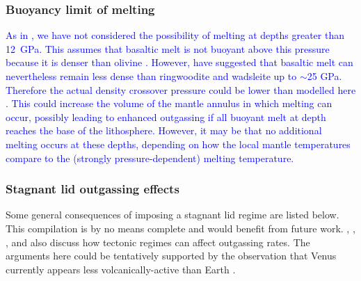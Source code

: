 \documentclass[3p,authoryear]{elsarticle}
\newcommand{\editthree}[2]{\textcolor{blue}{\sout{#1}#2}}
\begin{document}
\subsubsection{Buoyancy limit of melting}

\editthree{}{As in \citet{noack2014can, Noack2017}, we have not considered the possibility of melting at depths greater than 12~GPa. This assumes that basaltic melt is not buoyant above this pressure because it is denser than olivine \citep{Ohtani1995}. However, \citet{Mosenfelder2009} have suggested that basaltic melt can nevertheless remain less dense than ringwoodite and wadsleite up to $\sim$25 GPa. Therefore the actual density crossover pressure could be lower than modelled here \citep[e.g.,][]{Beuchert2013}. This could increase the volume of the mantle annulus in which melting can occur, possibly leading to enhanced outgassing if all buoyant melt at depth reaches the base of the lithosphere. However, it may be that no additional melting occurs at these depths, depending on how the local mantle temperatures compare to the (strongly pressure-dependent) melting temperature.}


\subsubsection{Stagnant lid outgassing effects}\label{sec:stagnant-lid}

Some general consequences of imposing a stagnant lid regime are listed below. This compilation is by no means complete and would benefit from future work. \citet{noack2014can}, \citet{tosi2017habitability}, \citet{Foley2018}, and \citet{Gaillard2021} also discuss how tectonic regimes can affect outgassing rates. The arguments here could be tentatively supported by the observation that Venus currently appears less volcanically-active than Earth \citep{Smrekar2010}. 
\end{document}
